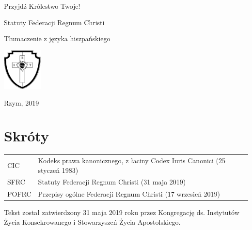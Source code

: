 ﻿\documentclass{book}
\begin{document}
\pagestyle{plain}


%
%
\begin{titlepage}
\begin{center}


Przyjdź Królestwo Twoje!


\vspace*{6cm}


{\Huge Statuty Federacji Regnum Christi}


Tłumaczenie z języka hiszpańskiego
            
\vspace*{1cm}


\includegraphics[width=2cm]{rc-logo-bw-712-755}


\vspace*{1cm}


\vfill


Rzym, 2019
            
\end{center}
\end{titlepage}






\tableofcontents
\cleardoublepage




\section*{Skróty }


\begin{tabular}{lp{}}


CIC & Kodeks prawa kanonicznego, z łaciny Codex Iuris Canonici (25 styczeń 1983) \\
SFRC & Statuty Federacji Regnum Christi (31 maja 2019) \\
POFRC & Przepisy ogólne Federacji Regnum Christi (17 wrzesień 2019)


\end{tabular}


\newpage


\vfill


Tekst został zatwierdzony 31 maja 2019 roku przez Kongregację ds. Instytutów Życia Konsekrowanego i Stowarzyszeń Życia Apostolskiego.
\end{document}
